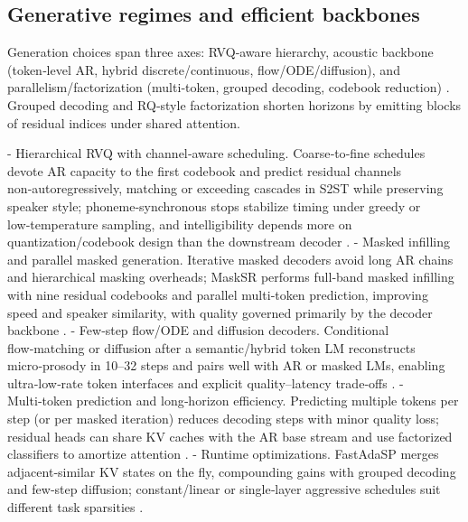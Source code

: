 \documentclass{article}
\begin{document}
\subsection{Generative regimes and efficient backbones} \label{subsec:Generative regimes and efficient backbones}
Generation choices span three axes: RVQ‑aware hierarchy, acoustic backbone (token‑level AR, hybrid discrete/continuous, flow/ODE/diffusion), and parallelism/factorization (multi‑token, grouped decoding, codebook reduction) \cite{ji2025languagecodecbridgingdiscreterepresentat,verma2024whispergpthybridrepresentationaudiolarge,li2024investigatingneuralaudiocodecsspeechlang,wang2024c3llmconditionalmultimodalcontentgenerat}. Grouped decoding and RQ‑style factorization shorten horizons by emitting blocks of residual indices under shared attention.

- Hierarchical RVQ with channel‑aware scheduling. Coarse‑to‑fine schedules devote AR capacity to the first codebook and predict residual channels non‑autoregressively, matching or exceeding cascades in S2ST while preserving speaker style; phoneme‑synchronous stops stabilize timing under greedy or low‑temperature sampling, and intelligibility depends more on quantization/codebook design than the downstream decoder \cite{peng2024mslms2stmultitaskspeechlanguagemodeltext,song2024ellavstableneuralcodeclanguagemodelingal,li2024investigatingneuralaudiocodecsspeechlang}.
- Masked infilling and parallel masked generation. Iterative masked decoders avoid long AR chains and hierarchical masking overheads; MaskSR performs full‑band masked infilling with nine residual codebooks and parallel multi‑token prediction, improving speed and speaker similarity, with quality governed primarily by the decoder backbone \cite{li2024masksrmaskedlanguagemodelfullbandspeechr,li2024investigatingneuralaudiocodecsspeechlang}.
- Few‑step flow/ODE and diffusion decoders. Conditional flow‑matching or diffusion after a semantic/hybrid token LM reconstructs micro‑prosody in 10–32 steps and pairs well with AR or masked LMs, enabling ultra‑low‑rate token interfaces and explicit quality–latency trade‑offs \cite{wang2025tadicodectextawarediffusionspeechtokeniz,li2024investigatingneuralaudiocodecsspeechlang}.
- Multi‑token prediction and long‑horizon efficiency. Predicting multiple tokens per step (or per masked iteration) reduces decoding steps with minor quality loss; residual heads can share KV caches with the AR base stream and use factorized classifiers to amortize attention \cite{li2024masksrmaskedlanguagemodelfullbandspeechr}.
- Runtime optimizations. FastAdaSP merges adjacent‑similar KV states on the fly, compounding gains with grouped decoding and few‑step diffusion; constant/linear or single‑layer aggressive schedules suit different task sparsities \cite{lu2024fastadaspmultitaskadaptedefficientinfere}.
\end{document}
